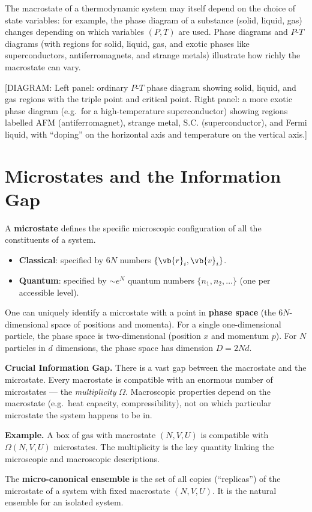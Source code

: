 The macrostate of a thermodynamic system may itself depend on the choice of state variables:
for example, the phase diagram of a substance (solid, liquid, gas) changes depending on which
variables $(P, T)$ are used. Phase diagrams and $P$-$T$ diagrams (with regions for solid,
liquid, gas, and exotic phases like superconductors, antiferromagnets, and strange metals)
illustrate how richly the macrostate can vary.

\begin{center}
[DIAGRAM: Left panel: ordinary $P$-$T$ phase diagram showing solid, liquid, and gas regions
with the triple point and critical point. Right panel: a more exotic phase diagram (e.g.\ for
a high-temperature superconductor) showing regions labelled AFM (antiferromagnet), strange
metal, $\mathrm{S.C.}$ (superconductor), and Fermi liquid, with ``doping'' on the horizontal
axis and temperature on the vertical axis.]
\end{center}

\section{Microstates and the Information Gap}

\begin{definition}
A \textbf{microstate} defines the specific microscopic configuration of all the constituents
of a system.
\begin{itemize}
  \item \textbf{Classical}: specified by $6N$ numbers $\{\vb{r}_i, \vb{v}_i\}$.
  \item \textbf{Quantum}: specified by $\sim e^N$ quantum numbers $\{n_1, n_2, \ldots\}$ (one
        per accessible level).
\end{itemize}
\end{definition}

One can uniquely identify a microstate with a point in \textbf{phase space} (the
$6N$-dimensional space of positions and momenta). For a single one-dimensional particle, the
phase space is two-dimensional (position $x$ and momentum $p$). For $N$ particles in $d$
dimensions, the phase space has dimension $D = 2Nd$.

\begin{fact}
\textbf{Crucial Information Gap.} There is a vast gap between the macrostate and the
microstate. Every macrostate is compatible with an enormous number of microstates --- the
\emph{multiplicity} $\Omega$. Macroscopic properties depend on the macrostate (e.g.\ heat
capacity, compressibility), not on which particular microstate the system happens to be in.
\end{fact}

\textbf{Example.} A box of gas with macrostate $(N, V, U)$ is compatible with $\Omega(N, V, U)$
microstates. The multiplicity is the key quantity linking the microscopic and macroscopic
descriptions.

\begin{definition}
The \textbf{micro-canonical ensemble} is the set of all copies (``replicas'') of the
microstate of a system with fixed macrostate $(N, V, U)$. It is the natural ensemble for an
isolated system.
\end{definition}
